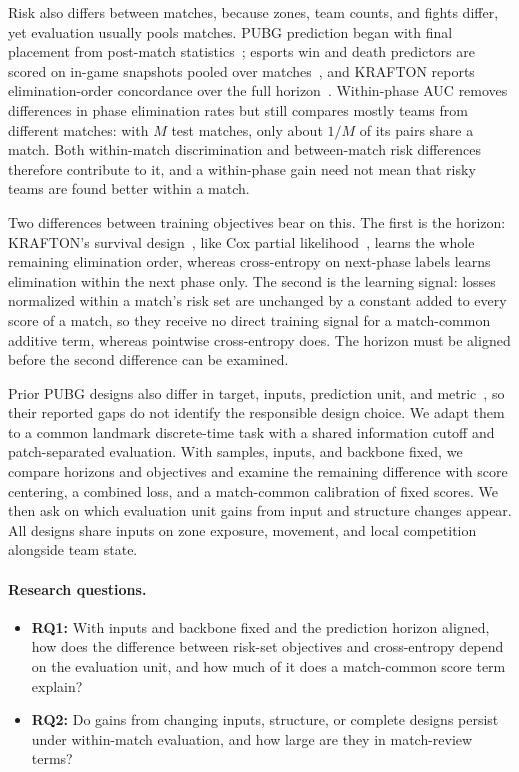 \documentclass[sigconf,anonymous,nonacm]{acmart}
\begin{document}
Risk also differs between matches, because zones, team counts, and fights differ, yet evaluation usually pools matches. PUBG prediction began with final placement from post-match statistics~\cite{KagglePUBG,LeeLee25}; esports win and death predictors are scored on in-game snapshots pooled over matches~\cite{Hodge21,Katona19,Marshall22}, and KRAFTON reports elimination-order concordance over the full horizon~\cite{KRAFTON}. Within-phase AUC removes differences in phase elimination rates but still compares mostly teams from different matches: with $M$ test matches, only about $1/M$ of its pairs share a match. Both within-match discrimination and between-match risk differences therefore contribute to it, and a within-phase gain need not mean that risky teams are found better within a match.

Two differences between training objectives bear on this. The first is the horizon: KRAFTON's survival design~\cite{KRAFTON}, like Cox partial likelihood~\cite{Cox72}, learns the whole remaining elimination order, whereas cross-entropy on next-phase labels learns elimination within the next phase only. The second is the learning signal: losses normalized within a match's risk set are unchanged by a constant added to every score of a match, so they receive no direct training signal for a match-common additive term, whereas pointwise cross-entropy does. The horizon must be aligned before the second difference can be examined.

Prior PUBG designs also differ in target, inputs, prediction unit, and metric~\cite{Sagong25a,KRAFTON}, so their reported gaps do not identify the responsible design choice. We adapt them to a common landmark discrete-time task with a shared information cutoff and patch-separated evaluation. With samples, inputs, and backbone fixed, we compare horizons and objectives and examine the remaining difference with score centering, a combined loss, and a match-common calibration of fixed scores. We then ask on which evaluation unit gains from input and structure changes appear. All designs share inputs on zone exposure, movement, and local competition alongside team state.

\paragraph{Research questions.}
\begin{itemize}
\item \textbf{RQ1:} With inputs and backbone fixed and the prediction horizon aligned, how does the difference between risk-set objectives and cross-entropy depend on the evaluation unit, and how much of it does a match-common score term explain?
\item \textbf{RQ2:} Do gains from changing inputs, structure, or complete designs persist under within-match evaluation, and how large are they in match-review terms?
\end{itemize}
\end{document}
